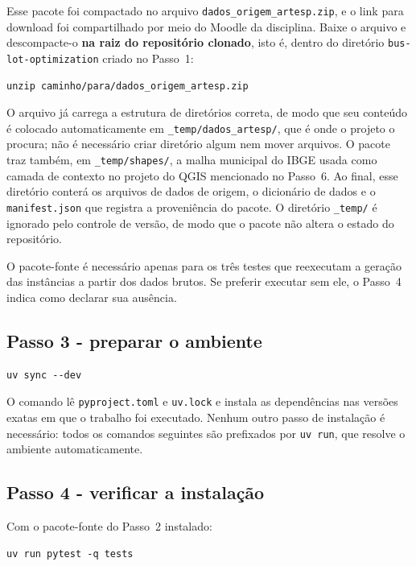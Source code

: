 \documentclass[12pt,a4paper]{article}
\begin{document}
Esse pacote foi compactado no arquivo
\texttt{dados\_origem\_artesp.zip}, e o link para download foi
compartilhado por meio do Moodle da disciplina. Baixe o arquivo e
descompacte-o \textbf{na raiz do repositório clonado}, isto é, dentro do
diretório \texttt{bus-lot-optimization} criado no Passo~1:

\begin{verbatim}
unzip caminho/para/dados_origem_artesp.zip
\end{verbatim}

O arquivo já carrega a estrutura de diretórios correta, de modo que seu
conteúdo é colocado automaticamente em \texttt{\_temp/dados\_artesp/},
que é onde o projeto o procura; não é necessário criar diretório algum
nem mover arquivos. O pacote traz também, em
\texttt{\_temp/shapes/}, a malha municipal do IBGE usada como camada de
contexto no projeto do QGIS mencionado no Passo~6. Ao final, esse diretório conterá os arquivos de dados
de origem, o dicionário de dados e o \texttt{manifest.json} que registra
a proveniência do pacote. O diretório \texttt{\_temp/} é ignorado pelo
controle de versão, de modo que o pacote não altera o estado do
repositório.

O pacote-fonte é necessário apenas para os três testes que reexecutam a
geração das instâncias a partir dos dados brutos. Se preferir executar
sem ele, o Passo~4 indica como declarar sua ausência.

\subsection{Passo 3 - preparar o ambiente}

\begin{verbatim}
uv sync --dev
\end{verbatim}

O comando lê \texttt{pyproject.toml} e \texttt{uv.lock} e instala as
dependências nas versões exatas em que o trabalho foi executado. Nenhum
outro passo de instalação é necessário: todos os comandos seguintes são
prefixados por \texttt{uv run}, que resolve o ambiente automaticamente.

\subsection{Passo 4 - verificar a instalação}

Com o pacote-fonte do Passo~2 instalado:

\begin{verbatim}
uv run pytest -q tests
\end{verbatim}
\end{document}
